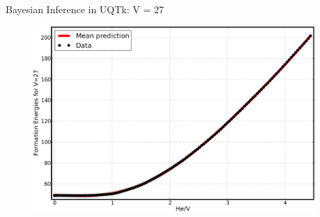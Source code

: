 \documentclass[10pt]{beamer}
\begin{document}
\begin{frame}{Bayesian Inference in UQTk: V = 27}
     \begin{figure}
         \includegraphics[width=0.95\textwidth]{V27_postpredabcd}
     \end{figure}
\end{frame}
\end{document}
